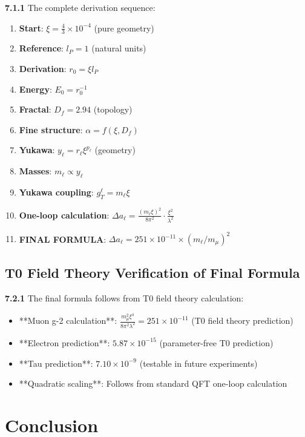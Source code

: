 \documentclass[12pt,a4paper]{article}
\newcommand{\lP}{l_P}
\newcommand{\rzero}{r_0}
\newcommand{\Ezero}{E_0}
\newcommand{\xipar}{\xi}
\begin{document}
	\noindent \textbf{7.1.1} The complete derivation sequence:
	\begin{enumerate}
		\item \textbf{Start}: $\xipar = \frac{4}{3} \times 10^{-4}$ (pure geometry)
		\item \textbf{Reference}: $\lP = 1$ (natural units)
		\item \textbf{Derivation}: $\rzero = \xipar \lP$
		\item \textbf{Energy}: $\Ezero = \rzero^{-1}$
		\item \textbf{Fractal}: $D_f = 2.94$ (topology)
		\item \textbf{Fine structure}: $\alpha = f(\xipar, D_f)$
		\item \textbf{Yukawa}: $y_\ell = r_\ell \xipar^{p_\ell}$ (geometry)
		\item \textbf{Masses}: $m_\ell \propto y_\ell$
		\item \textbf{Yukawa coupling}: $g_T^\ell = m_\ell \xi$
		\item \textbf{One-loop calculation}: $\Delta a_\ell = \frac{(m_\ell \xi)^2}{8\pi^2} \cdot \frac{\xi^2}{\lambda^2}$
		\item \textbf{FINAL FORMULA}: $\Delta a_\ell = 251 \times 10^{-11} \times (m_\ell/m_\mu)^2$
	\end{enumerate}
	
	\subsection{T0 Field Theory Verification of Final Formula}
	
	\noindent \textbf{7.2.1} The final formula follows from T0 field theory calculation:
	\begin{itemize}
		\item **Muon g-2 calculation**: $\frac{m_\mu^2 \xi^4}{8\pi^2 \lambda^2} = 251 \times 10^{-11}$ (T0 field theory prediction)
		\item **Electron prediction**: $5.87 \times 10^{-15}$ (parameter-free T0 prediction)
		\item **Tau prediction**: $7.10 \times 10^{-9}$ (testable in future experiments)
		\item **Quadratic scaling**: Follows from standard QFT one-loop calculation
	\end{itemize}
	
	\section{Conclusion}
	
\end{document}
